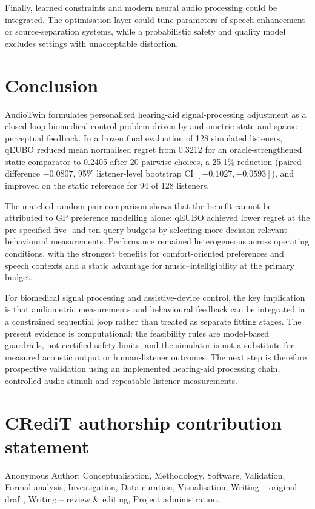 \documentclass[preprint,12pt]{elsarticle}
\begin{document}
Finally, learned constraints and modern neural audio processing could be integrated. The optimisation layer could tune parameters of speech-enhancement or source-separation systems, while a probabilistic safety and quality model excludes settings with unacceptable distortion.

\section{Conclusion}
\label{sec:conclusion}

AudioTwin formulates personalised hearing-aid signal-processing adjustment as a closed-loop biomedical control problem driven by audiometric state and sparse perceptual feedback. In a frozen final evaluation of 128 simulated listeners, qEUBO reduced mean normalised regret from 0.3212 for an oracle-strengthened static comparator to 0.2405 after 20 pairwise choices, a 25.1\% reduction (paired difference $-0.0807$, 95\% listener-level bootstrap CI $[-0.1027,-0.0593]$), and improved on the static reference for 94 of 128 listeners.

The matched random-pair comparison shows that the benefit cannot be attributed to GP preference modelling alone: qEUBO achieved lower regret at the pre-specified five- and ten-query budgets by selecting more decision-relevant behavioural measurements. Performance remained heterogeneous across operating conditions, with the strongest benefits for comfort-oriented preferences and speech contexts and a static advantage for music--intelligibility at the primary budget.

For biomedical signal processing and assistive-device control, the key implication is that audiometric measurements and behavioural feedback can be integrated in a constrained sequential loop rather than treated as separate fitting stages. The present evidence is computational: the feasibility rules are model-based guardrails, not certified safety limits, and the simulator is not a substitute for measured acoustic output or human-listener outcomes. The next step is therefore prospective validation using an implemented hearing-aid processing chain, controlled audio stimuli and repeatable listener measurements.

\section*{CRediT authorship contribution statement}
Anonymous Author: Conceptualisation, Methodology, Software, Validation, Formal analysis, Investigation, Data curation, Visualisation, Writing -- original draft, Writing -- review \& editing, Project administration.
\end{document}
